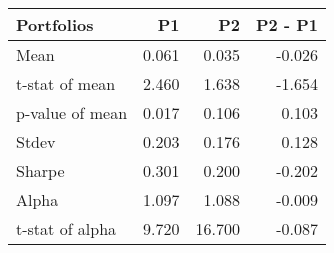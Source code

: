 \begin{tabular}{lrrr}
\toprule
Portfolios & P1 & P2 & P2 - P1 \\
\midrule
Mean & 0.061 & 0.035 & -0.026 \\
t-stat of mean & 2.460 & 1.638 & -1.654 \\
p-value of mean & 0.017 & 0.106 & 0.103 \\
Stdev & 0.203 & 0.176 & 0.128 \\
Sharpe & 0.301 & 0.200 & -0.202 \\
Alpha & 1.097 & 1.088 & -0.009 \\
t-stat of alpha & 9.720 & 16.700 & -0.087 \\
\bottomrule
\end{tabular}
